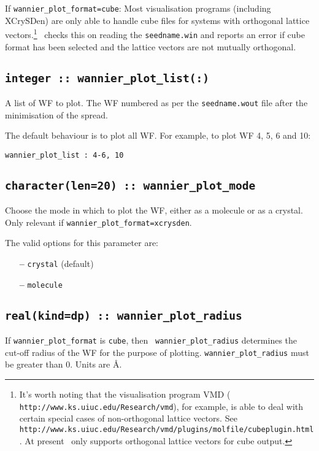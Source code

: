 If {\tt wannier\_plot\_format=cube}: Most visualisation programs
(including XCrySDen) are only able to handle cube files for systems
with orthogonal lattice vectors.\footnote{It's worth noting that the
  visualisation program VMD ({\tt
    http://www.ks.uiuc.edu/Research/vmd}), for example, is able to
  deal with certain special cases of non-orthogonal lattice
  vectors. See {\tt
    http://www.ks.uiuc.edu/Research/vmd/plugins/molfile/cubeplugin.html}.
    At present \wannier\ only supports orthogonal lattice vectors for cube output.}  
\wannier\ checks this on reading the {\tt seedname.win} and reports an
error if cube format has been selected and the lattice vectors are not
mutually orthogonal.

\subsection[wannier\_plot\_list]{\tt integer :: wannier\_plot\_list(:)}

 A list of WF to plot. The WF numbered
 as per the {\tt seedname.wout} file after the minimisation of the
 spread. 

 The default behaviour is to plot all WF. For example,
 to plot WF 4, 5, 6 and 10:

 \verb#wannier_plot_list : 4-6, 10#


\subsection[wannier\_plot\_mode]{\tt character(len=20) :: wannier\_plot\_mode}

Choose the mode in which to plot the WF, either as a molecule
or as a crystal. Only relevant if {\tt wannier\_plot\_format=xcrysden}. 

The valid options for this parameter are:
\begin{itemize}
\item[{\bf --}] \verb#crystal# (default)
\item[{\bf --}] \verb#molecule# 
\end{itemize}


\subsection[wannier\_plot\_radius]{\tt real(kind=dp) ::
  wannier\_plot\_radius}

If {\tt wannier\_plot\_format} is {\tt cube}, then {\tt
  wannier\_plot\_radius} determines the cut-off radius of the WF for
  the purpose of plotting. {\tt wannier\_plot\_radius} must be greater than
  0. Units are \AA.

